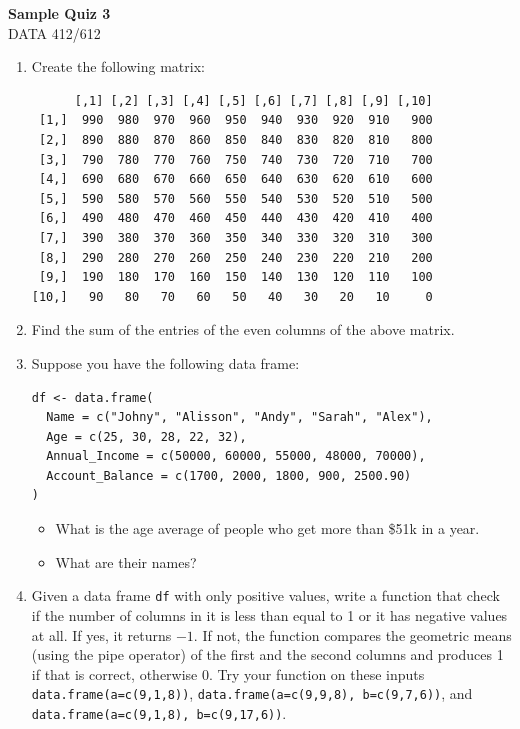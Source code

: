 \documentclass[11pt]{article}
\begin{document}
\begin{center}
{\LARGE\bfseries Sample Quiz 3}\\[0.35em]
DATA 412/612
\end{center}

\vspace{0.5em}

\begin{enumerate}
\item Create the following matrix:
\begin{lstlisting}
      [,1] [,2] [,3] [,4] [,5] [,6] [,7] [,8] [,9] [,10]
 [1,]  990  980  970  960  950  940  930  920  910   900
 [2,]  890  880  870  860  850  840  830  820  810   800
 [3,]  790  780  770  760  750  740  730  720  710   700
 [4,]  690  680  670  660  650  640  630  620  610   600
 [5,]  590  580  570  560  550  540  530  520  510   500
 [6,]  490  480  470  460  450  440  430  420  410   400
 [7,]  390  380  370  360  350  340  330  320  310   300
 [8,]  290  280  270  260  250  240  230  220  210   200
 [9,]  190  180  170  160  150  140  130  120  110   100
[10,]   90   80   70   60   50   40   30   20   10     0
\end{lstlisting}

\item Find the sum of the entries of the even columns of the above matrix.

\item Suppose you have the following data frame:
\begin{lstlisting}
df <- data.frame(
  Name = c("Johny", "Alisson", "Andy", "Sarah", "Alex"),
  Age = c(25, 30, 28, 22, 32),
  Annual_Income = c(50000, 60000, 55000, 48000, 70000),
  Account_Balance = c(1700, 2000, 1800, 900, 2500.90)
)
\end{lstlisting}
\begin{itemize}
\item What is the age average of people who get more than \$51k in a year.
\item What are their names?
\end{itemize}

\item Given a data frame \texttt{df} with only positive values, write a function that check if the number of columns in it is less than equal to 1 or it has negative values at all. If yes, it returns $-1$. If not, the function compares the geometric means (using the pipe operator) of the first and the second columns and produces 1 if that is correct, otherwise 0. Try your function on these inputs \texttt{data.frame(a=c(9,1,8))}, \texttt{data.frame(a=c(9,9,8), b=c(9,7,6))}, and \texttt{data.frame(a=c(9,1,8), b=c(9,17,6))}.
\end{enumerate}
\end{document}
